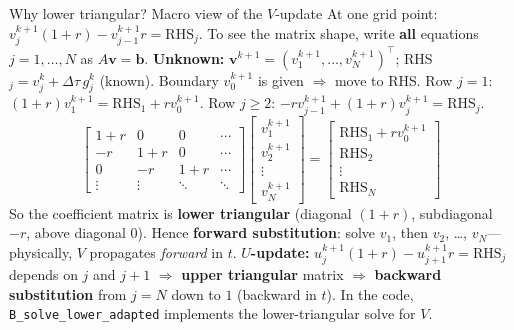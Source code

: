 \documentclass{beamer}
\begin{document}
\begin{frame}{Why lower triangular? Macro view of the $V$-update}
    At one grid point: $v_j^{k+1}(1+r) - v_{j-1}^{k+1} r = \mathrm{RHS}_j$. To see the matrix shape, write \textbf{all} equations $j=1,\ldots,N$ as $A\mathbf{v} = \mathbf{b}$.
    \vspace{0.4em}
    \textbf{Unknown:} $\mathbf{v}^{k+1} = (v_1^{k+1},\ldots,v_N^{k+1})^\top$; RHS$_j = v_j^k + \Delta\tau\,g_j^k$ (known). Boundary $v_0^{k+1}$ is given $\Rightarrow$ move to RHS.
    \vspace{0.4em}
    Row $j=1$: $(1+r)v_1^{k+1} = \mathrm{RHS}_1 + r v_0^{k+1}$. Row $j\ge 2$: $-r v_{j-1}^{k+1} + (1+r)v_j^{k+1} = \mathrm{RHS}_j$.
    \vspace{0.2em}
    \[
    \begin{bmatrix} 1+r & 0 & 0 & \cdots \\ -r & 1+r & 0 & \cdots \\ 0 & -r & 1+r & \cdots \\ \vdots & \vdots & \ddots & \ddots \end{bmatrix}
    \begin{bmatrix} v_1^{k+1} \\ v_2^{k+1} \\ \vdots \\ v_N^{k+1} \end{bmatrix}
    =
    \begin{bmatrix} \mathrm{RHS}_1 + r v_0^{k+1} \\ \mathrm{RHS}_2 \\ \vdots \\ \mathrm{RHS}_N \end{bmatrix}
    \]
    \vspace{0.2em}
    So the coefficient matrix is \textbf{lower triangular} (diagonal $(1+r)$, subdiagonal $-r$, above diagonal 0). Hence \textbf{forward substitution}: solve $v_1$, then $v_2$, \ldots, $v_N$---physically, $V$ propagates \emph{forward} in $t$.
    \vspace{0.3em}
    \textbf{$U$-update:} $u_j^{k+1}(1+r) - u_{j+1}^{k+1} r = \mathrm{RHS}_j$ depends on $j$ and $j+1$ $\Rightarrow$ \textbf{upper triangular} matrix $\Rightarrow$ \textbf{backward substitution} from $j=N$ down to $1$ (backward in $t$). In the code, \texttt{B\_solve\_lower\_adapted} implements the lower-triangular solve for $V$.
\end{frame}
\end{document}

